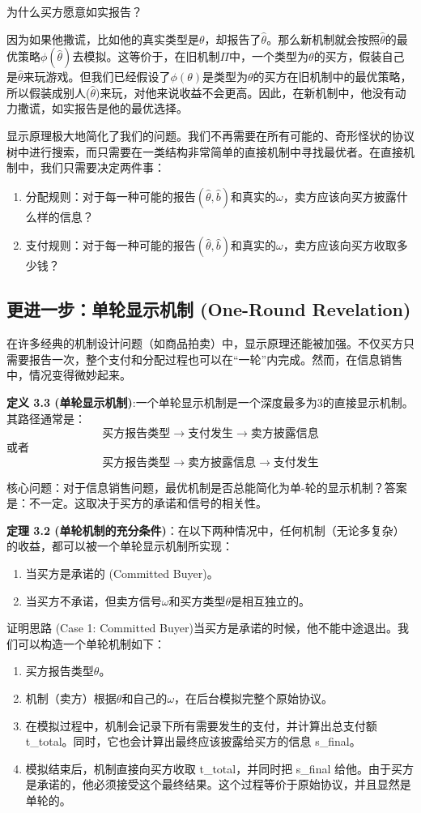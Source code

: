 为什么买方愿意如实报告？

因为如果他撒谎，比如他的真实类型是$\theta$，却报告了$\hat{\theta}$。那么新机制就会按照$\hat{\theta}$的最优策略$\phi(\hat{\theta})$去模拟。这等价于，在旧机制$\Pi$中，一个类型为$\theta$的买方，假装自己是$\hat{\theta}$来玩游戏。但我们已经假设了$\phi(\theta)$是类型为$\theta$的买方在旧机制中的最优策略，所以假装成别人($\hat{\theta}$)来玩，对他来说收益不会更高。因此，在新机制中，他没有动力撒谎，如实报告是他的最优选择。

显示原理极大地简化了我们的问题。我们不再需要在所有可能的、奇形怪状的协议树中进行搜索，而只需要在一类结构非常简单的直接机制中寻找最优者。在直接机制中，我们只需要决定两件事：
\begin{enumerate}
    \item 分配规则：对于每一种可能的报告$(\hat{\theta},\hat{b})$和真实的$\omega$，卖方应该向买方披露什么样的信息？
    \item 
    支付规则：对于每一种可能的报告$(\hat{\theta},\hat{b})$和真实的$\omega$，卖方应该向买方收取多少钱？
\end{enumerate}

\subsection{更进一步：单轮显示机制 (One-Round Revelation)}

在许多经典的机制设计问题（如商品拍卖）中，显示原理还能被加强。不仅买方只需要报告一次，整个支付和分配过程也可以在“一轮”内完成。然而，在信息销售中，情况变得微妙起来。

\textbf{定义 3.3 (单轮显示机制)}:一个单轮显示机制是一个深度最多为3的直接显示机制。其路径通常是：
$$\text{买方报告类型}\to\text{支付发生}\to\text{卖方披露信息}$$
或者
$$\text{买方报告类型}\to\text{卖方披露信息}\to\text{支付发生}$$

核心问题：对于信息销售问题，最优机制是否总能简化为单-轮的显示机制？答案是：不一定。这取决于买方的承诺和信号的相关性。

\textbf{定理 3.2 (单轮机制的充分条件)}：在以下两种情况中，任何机制（无论多复杂）的收益，都可以被一个单轮显示机制所实现：
\begin{enumerate}
    \item 当买方是承诺的 (Committed Buyer)。
    \item 当买方不承诺，但卖方信号$\omega$和买方类型$\theta$是相互独立的。
\end{enumerate}

证明思路 (Case 1: Committed Buyer)当买方是承诺的时候，他不能中途退出。我们可以构造一个单轮机制如下：
\begin{enumerate}
    \item 买方报告类型$\theta$。
    \item 机制（卖方）根据$\theta$和自己的$\omega$，在后台模拟完整个原始协议。
    \item 在模拟过程中，机制会记录下所有需要发生的支付，并计算出总支付额 t\_total。同时，它也会计算出最终应该披露给买方的信息 s\_final。
    \item 模拟结束后，机制直接向买方收取 t\_total，并同时把 s\_final 给他。由于买方是承诺的，他必须接受这个最终结果。这个过程等价于原始协议，并且显然是单轮的。
\end{enumerate}

